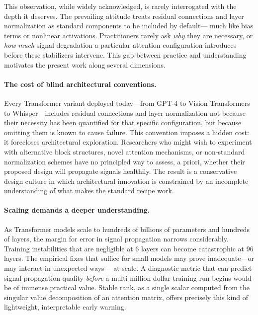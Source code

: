\documentclass[12pt, a4paper]{article}
\begin{document}
This observation, while widely acknowledged, is rarely interrogated with
the depth it deserves. The prevailing attitude treats residual connections
and layer normalization as standard components to be included by default---
much like bias terms or nonlinear activations. Practitioners rarely ask
\textit{why} they are necessary, or \textit{how much} signal degradation a
particular attention configuration introduces before these stabilizers
intervene. This gap between practice and understanding motivates the
present work along several dimensions.

\paragraph{The cost of blind architectural conventions.}
Every Transformer variant deployed today---from GPT-4 to Vision
Transformers to Whisper---includes residual connections and layer
normalization not because their necessity has been quantified for that
specific configuration, but because omitting them is known to cause
failure. This convention imposes a hidden cost: it forecloses
architectural exploration. Researchers who might wish to experiment with
alternative block structures, novel attention mechanisms, or
non-standard normalization schemes have no principled way to assess, a
priori, whether their proposed design will propagate signals healthily.
The result is a conservative design culture in which architectural
innovation is constrained by an incomplete understanding of what makes
the standard recipe work.

\paragraph{Scaling demands a deeper understanding.}
As Transformer models scale to hundreds of billions of parameters and
hundreds of layers, the margin for error in signal propagation narrows
considerably. Training instabilities that are negligible at 6 layers can
become catastrophic at 96 layers. The empirical fixes that suffice for
small models may prove inadequate---or may interact in unexpected ways---
at scale. A diagnostic metric that can predict signal propagation quality
\textit{before} a multi-million-dollar training run begins would be of
immense practical value. Stable rank, as a single scalar computed from
the singular value decomposition of an attention matrix, offers precisely
this kind of lightweight, interpretable early warning.
\end{document}

